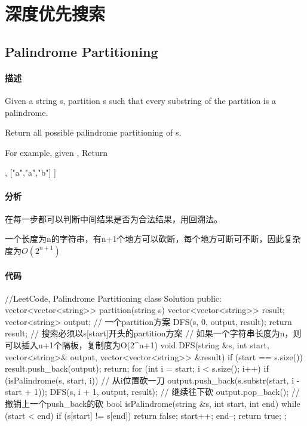 \chapter{深度优先搜索}


\section{Palindrome Partitioning} %
\label{sec:palindrome-partitioning}


\subsubsection{描述}
Given a string s, partition s such that every substring of the partition is a palindrome.

Return all possible palindrome partitioning of s.

For example, given ,
Return
\begin{Code}
  [
    ["aa","b"],
    ["a","a","b"]
  ]
\end{Code}


\subsubsection{分析}
在每一步都可以判断中间结果是否为合法结果，用回溯法。

一个长度为n的字符串，有n+1个地方可以砍断，每个地方可断可不断，因此复杂度为$O(2^{n+1})$


\subsubsection{代码}
\begin{Code}
//LeetCode, Palindrome Partitioning
class Solution {
public:
    vector<vector<string>> partition(string s) {
        vector<vector<string>> result;
        vector<string> output;  // 一个partition方案
        DFS(s, 0, output, result);
        return result;
    }
    // 搜索必须以s[start]开头的partition方案
    // 如果一个字符串长度为n，则可以插入n+1个隔板，复制度为O(2^{n+1})
    void DFS(string &s, int start, vector<string>& output,
            vector<vector<string>> &result) {
        if (start == s.size()) {
            result.push_back(output);
            return;
        }
        for (int i = start; i < s.size(); i++) {
            if (isPalindrome(s, start, i)) { // 从i位置砍一刀
                output.push_back(s.substr(start, i - start + 1));
                DFS(s, i + 1, output, result);  // 继续往下砍
                output.pop_back(); // 撤销上一个push_back的砍
            }
        }
    }
    bool isPalindrome(string &s, int start, int end) {
        while (start < end) {
            if (s[start] != s[end]) return false;
            start++;
            end--;
        }
        return true;
    }
};
\end{Code}


